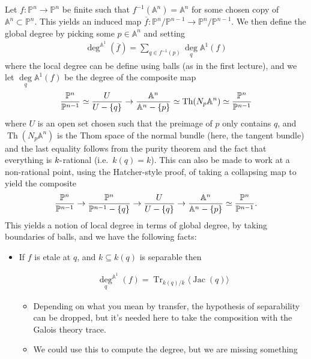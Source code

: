 Let \(f: {\mathbb{P}}^n \to {\mathbb{P}}^n\) be finite such that
\(f^{-1}({\mathbb{A}}^n) = {\mathbb{A}}^n\) for some chosen copy of
\({\mathbb{A}}^n \subset {\mathbb{P}}^n\). This yields an induced map
\(\overline f :{\mathbb{P}}^{n}/{\mathbb{P}}^{n-1} \to {\mathbb{P}}^{n}/{\mathbb{P}}^{n-1}\).
We then define the global degree by picking some \(p\in {\mathbb{A}}^n\)
and setting
\begin{align*}
\deg^{{\mathbb{A}}^1}(\overline f) = \sum_{q\in f^{-1}(p)}\underset{q}\deg{{\mathbb{A}}^1}(f)
\end{align*}
where the local degree can be define using balls (as in the first
lecture), and we let \(\underset{q}\deg{{\mathbb{A}}^1}(f)\) be the
degree of the composite map
\begin{align*}
{{\mathbb{P}}^{n} \over {\mathbb{P}}^{n-1}} \simeq{U \over U-\left\{{q}\right\}} \to {{\mathbb{A}}^n \over {\mathbb{A}}^n - \left\{{p}\right\}} \simeq\operatorname{Th}(N_p{\mathbb{A}}^n) \simeq{{\mathbb{P}}^{n} \over {\mathbb{P}}^{n-1}}
\end{align*}
where \(U\) is an open set chosen such that the preimage of \(p\) only
contains \(q\), and \(\operatorname{Th}(N_p{\mathbb{A}}^n)\) is the Thom
space of the normal bundle (here, the tangent bundle) and the last
equality follows from the purity theorem and the fact that everything is
\(k{\hbox{-}}\)rational (i.e.~\(k(q) = k\)). This can also be made to
work at a non-rational point, using the Hatcher-style proof, of taking a
collapsing map to yield the composite
\begin{align*}
{{\mathbb{P}}^{n} \over {\mathbb{P}}^{n-1}} \to {{\mathbb{P}}^{n} \over {\mathbb{P}}^{n-1} -\left\{{q}\right\}}\to {U \over U-\left\{{q}\right\}} \to {{\mathbb{A}}^n \over {\mathbb{A}}^n - \left\{{p}\right\}} \simeq{{\mathbb{P}}^{n} \over {\mathbb{P}}^{n-1}}.
\end{align*}
This yields a notion of local degree in terms of global degree, by
taking boundaries of balls, and we have the following facts:

\begin{itemize}
\item
  If \(f\) is etale at \(q\), and \(k \subseteq k(q)\) is separable then

  \begin{align*}
  \underset q \deg^{{\mathbb{A}}^1} (f) = \operatorname{Tr}_{k(q)/k} \langle \operatorname{Jac}(q) \rangle
  \end{align*}

  \begin{itemize}
  \tightlist
  \item
    Depending on what you mean by transfer, the hypothesis of
    separability can be dropped, but it's needed here to take the
    composition with the Galois theory trace.
  \item
    We could use this to compute the degree, but we are missing
    something
  \end{itemize}
\end{itemize}

